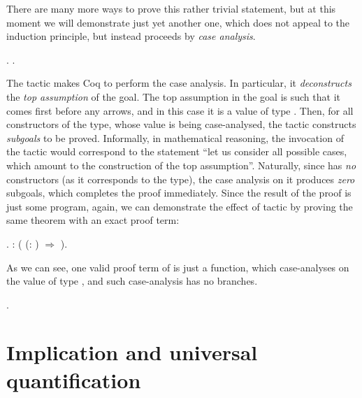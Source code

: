 There are many more ways to prove this rather trivial statement, but
at this moment we will demonstrate just yet another one, which does
not appeal to the  induction principle, but instead
proceeds by \textit{case analysis}.


\begin{coqdoccode}
\coqdocemptyline
\coqdocnoindent
{}.\coqdoceol
\coqdocemptyline
\coqdocnoindent
{}.\coqdoceol
\coqdocemptyline
\end{coqdoccode}


The tactic  makes Coq to perform the case
analysis. In particular, it \textit{deconstructs} the \textit{top assumption} of the
goal. The top assumption in the goal is such that it comes first
before any arrows, and in this case it is a value of type
. Then, for all constructors of the type, whose value is being
case-analysed, the tactic  constructs \textit{subgoals} to be
proved. Informally, in mathematical reasoning, the invocation of the
 tactic would correspond to the statement ``let us consider all
possible cases, which amount to the construction of the top
assumption''. Naturally, since  has \textit{no} constructors (as it
corresponds to the  type), the case analysis on it produces
\textit{zero} subgoals, which completes the proof immediately. Since the
result of the proof is just some program, again, we can demonstrate
the effect of  tactic by proving the same theorem with an exact
proof term:


\begin{coqdoccode}
\coqdocemptyline
\coqdocnoindent
{}.\coqdoceol
\coqdocemptyline
\coqdocnoindent
{}: ( (: ) \ensuremath{\Rightarrow}    ).\coqdoceol
\coqdocemptyline
\end{coqdoccode}


As we can see, one valid proof term of  is just a
function, which case-analyses on the value of type , and such
case-analysis has no branches.


\begin{coqdoccode}
\coqdocemptyline
\coqdocnoindent
{}.\coqdoceol
\coqdocemptyline
\end{coqdoccode}
\section{Implication and universal quantification}




